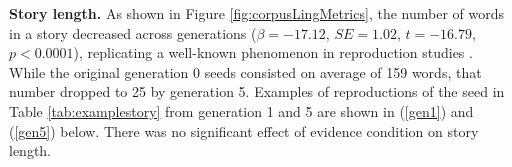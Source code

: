 \documentclass[10pt,letterpaper]{article}
\begin{document}
\textbf{Story length.} As shown in Figure \ref{fig:corpusLingMetrics}, the number of words in a story decreased across generations ($\beta = -17.12$, $SE = 1.02$, $t = -16.79$, $p < 0.0001$), replicating a well-known phenomenon in reproduction studies \cite{Bartlett:1932}. While the original generation 0 seeds consisted on average of 159 words, that number dropped to 25 by generation 5. Examples of reproductions of the seed in Table \ref{tab:examplestory} from generation 1 and 5 are shown in (\ref{gen1}) and (\ref{gen5}) below. There was no significant effect of evidence condition on story length.


\end{document}
